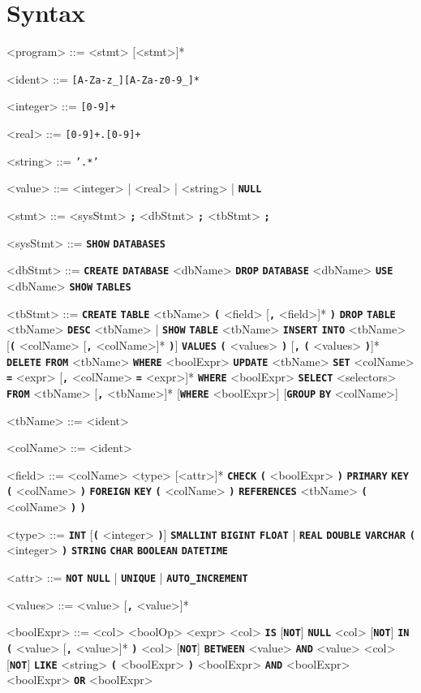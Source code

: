 \documentclass{article}
\renewcommand{\t}[1]{\texttt{\textbf{#1}}}
\begin{document}
\section{Syntax}
\setlength{\grammarindent}{10em}
\begin{grammar}

<program> ::= <stmt> [<stmt>]*

<ident> ::= \texttt{[A-Za-z_][A-Za-z0-9_]*}

<integer> ::= \texttt{[0-9]+}

<real> ::= \texttt{[0-9]+.[0-9]+}

<string> ::= \texttt{'.*'}

<value> ::= <integer> | <real> | <string> | \t{NULL}

<stmt> ::= <sysStmt> \t{;}
\alt <dbStmt> \t{;}
\alt <tbStmt> \t{;}

<sysStmt> ::= \t{SHOW} \t{DATABASES}

<dbStmt> ::= \t{CREATE} \t{DATABASE} <dbName>
\alt \t{DROP} \t{DATABASE} <dbName>
\alt \t{USE} <dbName>
\alt \t{SHOW} \t{TABLES}

<tbStmt> ::= \t{CREATE} \t{TABLE} <tbName> \t{(} <field> [\t{,} <field>]* \t{)}
\alt \t{DROP} \t{TABLE} <tbName>
\alt \t{DESC} <tbName> | \t{SHOW} \t{TABLE} <tbName>
\alt \t{INSERT} \t{INTO} <tbName> [\t{(} <colName> [\t{,} <colName>]* \t{)}] \t{VALUES} \t{(} <values> \t{)} [\t{,} \t{(} <values> \t{)}]*
\alt \t{DELETE} \t{FROM} <tbName> \t{WHERE} <boolExpr>
\alt \t{UPDATE} <tbName> \t{SET} <colName> \t{=} <expr> [\t{,} <colName> \t{=} <expr>]* \t{WHERE} <boolExpr>
\alt \t{SELECT} <selectors> \t{FROM} <tbName> [\t{,} <tbName>]* [\t{WHERE} <boolExpr>] [\t{GROUP} \t{BY} <colName>]

<tbName> ::= <ident>

<colName> ::= <ident>

<field> ::= <colName> <type> [<attr>]*
\alt \t{CHECK} \t{(} <boolExpr> \t{)}
\alt \t{PRIMARY} \t{KEY} \t{(} <colName> \t{)}
\alt \t{FOREIGN} \t{KEY} \t{(} <colName> \t{)} \t{REFERENCES} <tbName> \t{(} <colName> \t{)} \t{)}

<type> ::= \t{INT} [\t{(} <integer> \t{)}]
\alt \t{SMALLINT}
\alt \t{BIGINT}
\alt \t{FLOAT} | \t{REAL}
\alt \t{DOUBLE}
\alt \t{VARCHAR} \t{(} <integer> \t{)}
\alt \t{STRING}
\alt \t{CHAR}
\alt \t{BOOLEAN}
\alt \t{DATETIME}

<attr> ::= \t{NOT} \t{NULL} | \t{UNIQUE} | \t{AUTO_INCREMENT}

<values> ::= <value> [\t{,} <value>]*

<boolExpr> ::= <col> <boolOp> <expr>
\alt <col> \t{IS} [\t{NOT}] \t{NULL}
\alt <col> [\t{NOT}] \t{IN} \t{(} <value> [\t{,} <value>]* \t{)}
\alt <col> [\t{NOT}] \t{BETWEEN} <value> \t{AND} <value>
\alt <col> [\t{NOT}] \t{LIKE} <string>
\alt \t{(} <boolExpr> \t{)}
\alt <boolExpr> \t{AND} <boolExpr>
\alt <boolExpr> \t{OR} <boolExpr>


\end{grammar}
\end{document}
